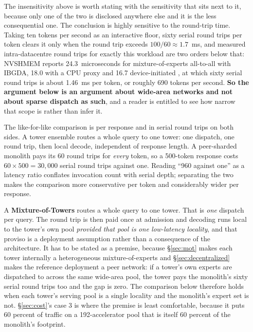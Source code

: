 \documentclass[11pt]{article}
\begin{document}
The insensitivity above is worth stating with the sensitivity that sits next to it, because only one of the two is disclosed anywhere else and it is the less consequential one. The conclusion is highly sensitive to the round-trip time. Taking ten tokens per second as an interactive floor, sixty serial round trips per token clears it only when the round trip exceeds $100/60 \approx 1.7$~ms, and measured intra-datacentre round trips for exactly this workload are two orders below that: NVSHMEM reports 24.3~microseconds for mixture-of-experts all-to-all with IBGDA, 18.0 with a CPU proxy and 16.7 device-initiated \cite{nvshmem2026ibgda}, at which sixty serial round trips is about 1.46~ms per token, or roughly 690 tokens per second. \textbf{So the argument below is an argument about wide-area networks and not about sparse dispatch as such}, and a reader is entitled to see how narrow that scope is rather than infer it.

The like-for-like comparison is per response and in serial round trips on both sides. A tower ensemble routes a whole query to one tower: one dispatch, one round trip, then local decode, independent of response length. A peer-sharded monolith pays its 60 round trips for \emph{every} token, so a 500-token response costs $60 \times 500 = 30{,}000$ serial round trips against one. Reading ``960 against one'' as a latency ratio conflates invocation count with serial depth; separating the two makes the comparison more conservative per token and considerably wider per response.

A \textbf{Mixture-of-Towers} routes a whole query to one tower. That is \emph{one} dispatch per query. The round trip is then paid once at admission and decoding runs local to the tower's own pool \emph{provided that pool is one low-latency locality}, and that proviso is a deployment assumption rather than a consequence of the architecture. It has to be stated as a premise, because \S\ref{sec:mot} makes each tower internally a heterogeneous mixture-of-experts and \S\ref{sec:decentralized} makes the reference deployment a peer network: if a tower's own experts are dispatched to across the same wide-area pool, the tower pays the monolith's sixty serial round trips too and the gap is zero. The comparison below therefore holds when each tower's serving pool is a single locality and the monolith's expert set is not. \S\ref{sec:cost}'s case 3 is where the premise is least comfortable, because it puts 60 percent of traffic on a 192-accelerator pool that is itself 60 percent of the monolith's footprint.
\end{document}

